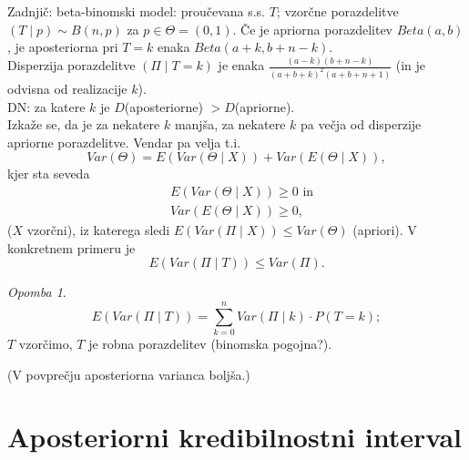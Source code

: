 \documentclass[a4paper, 12pt]{book}
\theoremstyle{definition}
\theoremstyle{remark}
\newtheorem*{rem}{Opomba}
\begin{document}

Zadnjič: beta-binomski model: proučevana s.s. $T$;
vzorčne porazdelitve $(T \mid p) \sim B(n,p)$ za $p \in \Theta = (0,1)$.
Če je apriorna porazdelitev $Beta(a,b)$, je aposteriorna pri $T = k$ enaka $Beta(a+k, b+n-k)$. \\
Disperzija porazdelitve $(\Pi \mid T = k)$ je enaka $\frac{(a-k)(b+n-k)}{(a+b+k)^2(a+b+n+1)}$
(in je odvisna od realizacije $k$). \\
DN: za katere $k$ je $D$(aposteriorne) $> D$(apriorne). \\
Izkaže se, da je za nekatere $k$ manjša, za nekatere $k$ pa večja od disperzije apriorne porazdelitve.
Vendar pa velja t.i. 
\begin{equation*}
  Var(\Theta) = E(Var(\Theta \mid X)) + Var(E(\Theta \mid X)),
\end{equation*}
kjer sta seveda
\begin{align*}
  &E(Var(\Theta \mid X)) \geq 0 \text{ in} \\
  &Var(E(\Theta \mid X)) \geq 0,
\end{align*}
($X$ vzorčni), iz katerega sledi $E(Var(\Pi \mid X)) \leq Var(\Theta)$ (apriori).
V konkretnem primeru je
\begin{equation*}
  E(Var(\Pi \mid T)) \leq Var(\Pi).
\end{equation*}
\begin{rem}
  \begin{equation*}
    E(Var(\Pi \mid T)) = \sum_{k=0}^{n} Var(\Pi \mid k) \cdot P(T = k);
  \end{equation*}
  $T$ vzorčimo, $T$ je robna porazdelitev (binomska pogojna?).
\end{rem}
(V povprečju aposteriorna varianca boljša.)


\section{Aposteriorni kredibilnostni interval}
\end{document}
